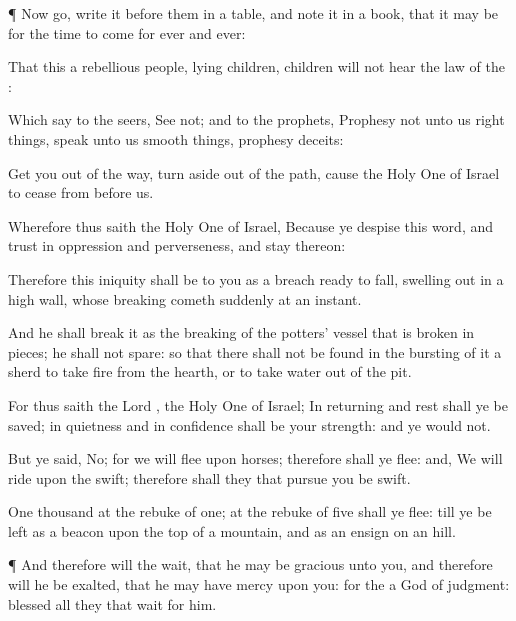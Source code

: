 {\par }{\PP {}¶ Now
go,
write it before them in a
table, and
note it in a
book, that it may be for the
time to
come
for
ever and
ever:

That this
{} a
rebellious
people,
lying
children,
children
{}
will not
hear the
law of the
{}:

Which
say to the
seers,
See not; and to the
prophets,
Prophesy not unto us right
things,
speak unto us smooth
things,
prophesy
deceits:

Get you
out of the
way, turn
aside out of the
path, cause the Holy
One of
Israel to
cease from
before us.

Wherefore thus
saith the Holy
One of
Israel, Because ye
despise this
word, and
trust in
oppression and
perverseness, and
stay thereon:

Therefore this
iniquity shall be to you as a
breach ready to
fall, swelling
out in a
high
wall, whose
breaking
cometh
suddenly at an
instant.

And he shall
break it as the
breaking of the
potters’
vessel that is broken in
pieces; he shall not
spare: so that there shall not be
found in the
bursting of it a
sherd to
take
fire from the
hearth, or to
take
water
{} out of the
pit.

For thus
saith the
Lord
{}, the Holy
One of
Israel; In
returning and
rest shall ye be
saved; in
quietness and in
confidence shall be your
strength: and ye
would not.

But ye
said, No; for we will
flee upon
horses; therefore shall ye
flee: and, We will
ride upon the
swift; therefore shall they that
pursue you be
swift.

One
thousand
{}
at the
rebuke of
one;
at the
rebuke of
five shall ye
flee: till ye be
left as a
beacon upon the
top of a
mountain, and as an
ensign on an
hill.


\par }{\PP {}¶ And therefore will the
{}
wait, that he may be
gracious unto you, and therefore will he be
exalted, that he may have
mercy upon you: for the
{}
{} a
God of
judgment:
blessed
{} all they that
wait for him.

}

